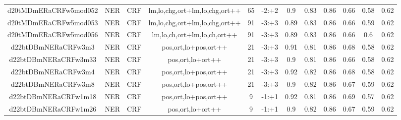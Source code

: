 \documentclass[a4paper]{article}
\begin{document}
\begin{landscape}
\begin{center}
\begin{tabular}{ |c|c|c|c|c|c|c|c|c|c|c|c|}
 	
 
 	
 		
 		\small{ d20tMDmERaCRFw5mod052 } & NER & CRF & lm,lo,chg,ort+lm,lo,chg,ort++  &  65 &  -2:+2  &  0.9 & 0.83 & 0.86  &  0.66 & 0.58 & 0.62 \\
 		

 	
 
 	
 		
 		\small{ d20tMDmERaCRFw5mod053 } & NER & CRF & lm,lo,chg,ort+lm,lo,chg,ort++  &  91 &  -3:+3  &  0.89 & 0.83 & 0.86  &  0.66 & 0.59 & 0.62 \\
 		

 	
 
 	
 		
 		\small{ d20tMDmERaCRFw5mod056 } & NER & CRF & lm,lo,ch,ort+lm,lo,ch,ort++  &  91 &  -3:+3  &  0.89 & 0.83 & 0.86  &  0.66 & 0.6 & 0.62 \\
 		

 	
 
 	
 		
 		\small{ d22btDBmNERaCRFw3m3 } & NER & CRF & pos,ort,lo+pos,ort++  &  21 &  -3:+3  &  0.91 & 0.81 & 0.86  &  0.68 & 0.58 & 0.62 \\
 		

 	
 
 	
 		
 		\small{ d22btDBmNERaCRFw3m33 } & NER & CRF & pos,ort,lo+ort++  &  21 &  -3:+3  &  0.9 & 0.81 & 0.86  &  0.66 & 0.58 & 0.62 \\
 		

 	
 
 	
 		
 		\small{ d22btDBmNERaCRFw3m4 } & NER & CRF & pos,ort,lo+pos,ort++  &  21 &  -3:+3  &  0.92 & 0.82 & 0.86  &  0.68 & 0.58 & 0.62 \\
 		

 	
 
 	
 		
 		\small{ d22btDBmNERaCRFw3m8 } & NER & CRF & pos,ort,lo+pos,ort++  &  21 &  -3:+3  &  0.9 & 0.82 & 0.86  &  0.67 & 0.59 & 0.62 \\
 		

 	
 
 	
 		
 		\small{ d22btDBmNERaCRFw1m18 } & NER & CRF & pos,ort,lo+pos,ort++  &  9 &  -1:+1  &  0.92 & 0.81 & 0.86  &  0.69 & 0.57 & 0.62 \\
 		

 	
 
 	
 		
 		\small{ d22btDBmNERaCRFw1m26 } & NER & CRF & pos,ort,lo+ort++  &  9 &  -1:+1  &  0.9 & 0.82 & 0.86  &  0.67 & 0.59 & 0.62 \\
 		


\end{tabular}
\end{center}
\end{landscape}
\end{document}

